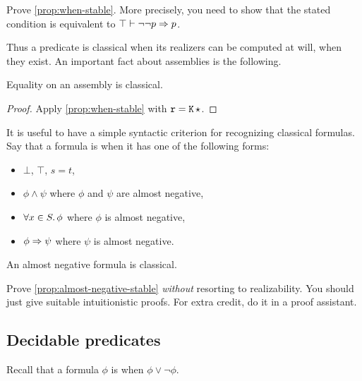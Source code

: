 \begin{exercise}
  Prove \cref{prop:when-stable}. More precisely, you need to show that the stated condition is equivalent to $\top \vdash \lnot\lnot p \Rightarrow p$.
\end{exercise}

Thus a predicate is classical when its realizers can be computed at will, when they exist.
%
An important fact about assemblies is the following.

\begin{proposition}
  Equality on an assembly is classical.
\end{proposition}

\begin{proof}
  Apply \cref{prop:when-stable} with $\mathtt{r} = \mathtt{K}\,{\star}$.
\end{proof}

It is useful to have a simple syntactic criterion for recognizing classical formulas. Say that a formula is  when it has one of the following forms:
%
\begin{itemize}
\item $\bot$, $\top$, $s = t$,
\item $\phi \land \psi$ where $\phi$ and $\psi$ are almost negative,
\item $\forall x \in S .\, \phi$ where $\phi$ is almost negative,
\item $\phi \Rightarrow \psi$ where $\psi$ is almost negative.
\end{itemize}

\begin{proposition}
  \label{prop:almost-negative-stable}
  An almost negative formula is classical.
\end{proposition}

\begin{exercise}
  Prove \cref{prop:almost-negative-stable} \emph{without} resorting to realizability. You should just give suitable intuitionistic proofs. For extra credit, do it in a proof assistant.
\end{exercise}

\subsection{Decidable predicates}
\label{sec:decidable-predicates}

Recall that a formula $\phi$ is  when $\phi \lor \lnot \phi$.

